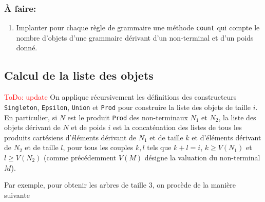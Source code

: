 \documentclass[11pt]{article}
\newcommand\todo[1]{\textcolor{red}{ToDo: #1}}
\newcounter{asuivre}
\newenvironment{asks}{\begin{enumerate}\setcounter{enumi}{\theasuivre}}%
                       {\setcounter{asuivre}{\theenumi}\end{enumerate}}
\begin{document}
\subsubsection{À faire:}
\begin{asks}
\item Implanter pour chaque règle de grammaire une méthode
  \texttt{count} qui compte le nombre d'objets d'une grammaire dérivant
  d'un non-terminal et d'un poids donné.
\end{asks}


\subsection{Calcul de la liste des objets}
\todo{update}
On applique récursivement les définitions des constructeurs
\texttt{Singleton}, \texttt{Epsilon}, \texttt{Union} et \texttt{Prod} pour
construire la liste des objets de taille $i$. En particulier, si $N$ est le
produit \texttt{Prod} des non-terminaux $N_1$ et $N_2$, la liste des objets
dérivant de $N$ et de poids $i$ est la concaténation des listes de tous les
produits cartésiens d'éléments dérivant de $N_1$ et de taille $k$ et
d'éléments dérivant de $N_2$ et de taille $l$, pour tous les couples $k,l$
tels que $k+l=i$, $k \geq V(N_1)$ et $l \geq V(N_2)$ (comme précédemment
$V(M)$ désigne la valuation du non-terminal $M$).

Par exemple, pour obtenir les arbres de taille $3$, on procède de la manière
suivante
\end{document}
